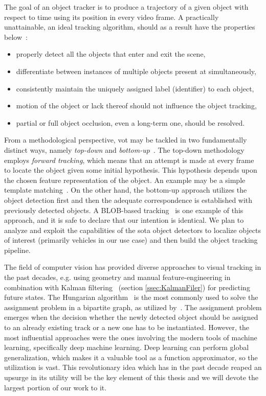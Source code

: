 The goal of an object tracker is to produce a trajectory of a given object with respect to time using its position in every video frame. A practically unattainable, an ideal tracking algorithm, should as a result have the properties below~\cite{jalal2012sotavot}:

\begin{itemize}
    \item properly detect all the objects that enter and exit the scene,
    \item differentiate between instances of multiple objects present at simultaneously,
    \item consistently maintain the uniquely assigned label (identifier) to each object,
    \item motion of the object or lack thereof should not influence the object tracking,
    \item partial or full object occlusion, even a long-term one, should be resolved.
\end{itemize}

From a methodological perspective, \gls{vot} may be tackled in two fundamentally distinct ways, namely \emph{top-down} and \emph{bottom-up}~\cite{jalal2012sotavot}. The top-down methodology employs \emph{forward tracking}, which means that an attempt is made at every frame to locate the object given some initial hypothesis. This hypothesis depends upon the chosen feature representation of the object. An example may be a simple template matching~\cite{comaniciu2003kernel}. On the other hand, the bottom-up approach utilizes the object detection first and then the adequate correspondence is established with previously detected objects. A BLOB-based tracking~\cite{wren1997pfinder} is one example of this approach, and it is safe to declare that our intention is identical. We plan to analyze and exploit the capabilities of the \gls{sota} object detectors to localize objects of interest (primarily vehicles in our use case) and then build the object tracking pipeline.

The field of computer vision has provided diverse approaches to visual tracking in the past decades, e.g. using geometry and manual feature-engineering in combination with Kalman filtering~\cite{kalman1960linearfilter} (section \ref{ssec:KalmanFiler}) for predicting future states. The Hungarian algorithm~\cite{kuhn1995hungarian} is the most commonly used to solve the assignment problem in a bipartite graph, as utilized by~\cite{bawley2016simple}. The assignment problem emerges when the decision whether the newly detected object should be assigned to an already existing track or a new one has to be instantiated. However, the most influential approaches were the ones involving the modern tools of machine learning, specifically deep machine learning. Deep learning can perform global generalization, which makes it a valuable tool as a function approximator, so the utilization is vast. This revolutionary idea which has in the past decade reaped an upsurge in its utility will be the key element of this thesis and we will devote the largest portion of our work to it.

